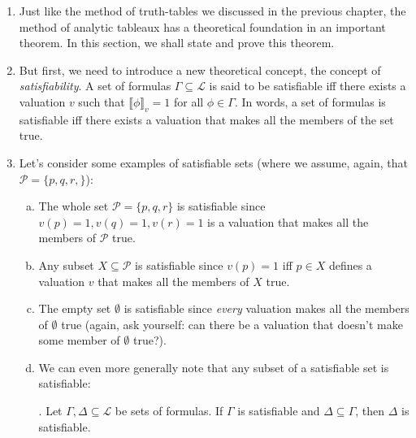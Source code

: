 	\begin{enumerate}[\thesection.1]

		\item Just like the method of truth-tables we discussed in the previous chapter, the method of analytic tableaux has a theoretical foundation in an important theorem. In this section, we shall state and prove this theorem.
		
		\item  But first, we need to introduce a new theoretical concept, the concept of \emph{satisfiability}. A set of formulas $\Gamma\subseteq\mathcal{L}$ is said to be satisfiable iff there exists a valuation $v$ such that $\llbracket\phi\rrbracket_v=1$ for all $\phi\in\Gamma$. In words, a set of formulas is satisfiable iff there exists a valuation that makes all the members of the set true. 
		
		\item Let's consider some examples of satisfiable sets (where we assume, again, that $\mathcal{P}=\{p,q,r,\}$):
		
			\begin{enumerate}[(a)]
			
				\item The whole set $\mathcal{P}=\{p,q,r\}$ is satisfiable since $v(p)=1, v(q)=1, v(r)=1$ is a valuation that makes all the members of $\mathcal{P}$ true.
				
				\item Any subset $X\subseteq \mathcal{P}$ is satisfiable since $v(p)=1$ iff $p\in X$ defines a valuation $v$ that makes all the members of $X$ true.
				
				\item The empty set $\emptyset$ is satisfiable since \emph{every} valuation makes all the members of $\emptyset$ true (again, ask yourself: can there be a valuation that doesn't make some member of $\emptyset$ true?). 
				
				\item We can even more generally note that any subset of a satisfiable set is satisfiable:
				
				\begin{proposition}. Let $\Gamma,\Delta\subseteq\mathcal{L}$ be sets of formulas. If $\Gamma$ is satisfiable and $\Delta\subseteq \Gamma$, then $\Delta$ is satisfiable.
				\end{proposition}
				

\end{enumerate}
\end{enumerate}
